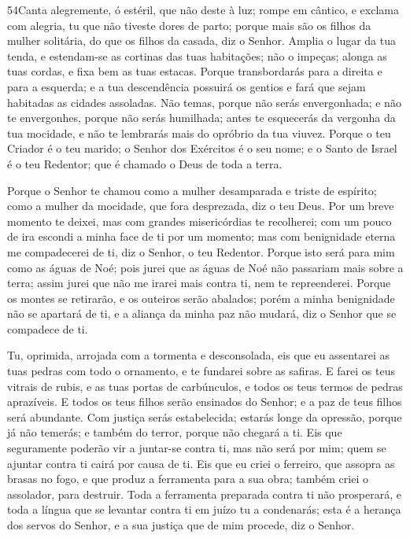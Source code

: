 \medskip

\lettrine{54}{}Canta alegremente, ó estéril, que não deste à
luz; rompe em cântico, e exclama com alegria, tu que não tiveste
dores de parto; porque mais são os filhos da mulher solitária, do
que os filhos da casada, diz o Senhor. Amplia o lugar da tua
tenda, e estendam-se as cortinas das tuas habitações; não o impeças;
alonga as tuas cordas, e fixa bem as tuas estacas. Porque
transbordarás para a direita e para a esquerda; e a tua descendência
possuirá os gentios e fará que sejam habitadas as cidades assoladas.
Não temas, porque não serás envergonhada; e não te envergonhes,
porque não serás humilhada; antes te esquecerás da vergonha da tua
mocidade, e não te lembrarás mais do opróbrio da tua viuvez.
Porque o teu Criador é o teu marido; o Senhor dos Exércitos é o
seu nome; e o Santo de Israel é o teu Redentor; que é chamado o Deus
de toda a terra.

Porque o Senhor te chamou como a mulher desamparada e triste de
espírito; como a mulher da mocidade, que fora desprezada, diz o teu
Deus. Por um breve momento te deixei, mas com grandes
misericórdias te recolherei; com um pouco de ira escondi a minha
face de ti por um momento; mas com benignidade eterna me
compadecerei de ti, diz o Senhor, o teu Redentor. Porque isto
será para mim como as águas de Noé; pois jurei que as águas de Noé
não passariam mais sobre a terra; assim jurei que não me irarei mais
contra ti, nem te repreenderei. Porque os montes se
retirarão, e os outeiros serão abalados; porém a minha benignidade
não se apartará de ti, e a aliança da minha paz não mudará, diz o
Senhor que se compadece de ti.

Tu, oprimida, arrojada com a tormenta e desconsolada, eis que eu
assentarei as tuas pedras com todo o ornamento, e te fundarei sobre
as safiras. E farei os teus vitrais de rubis, e as tuas
portas de carbúnculos, e todos os teus termos de pedras aprazíveis.
E todos os teus filhos serão ensinados do Senhor; e a paz de
teus filhos será abundante. Com justiça serás estabelecida;
estarás longe da opressão, porque já não temerás; e também do
terror, porque não chegará a ti. Eis que seguramente poderão
vir a juntar-se contra ti, mas não será por mim; quem se ajuntar
contra ti cairá por causa de ti. Eis que eu criei o ferreiro,
que assopra as brasas no fogo, e que produz a ferramenta para a sua
obra; também criei o assolador, para destruir. Toda a
ferramenta preparada contra ti não prosperará, e toda a língua que
se levantar contra ti em juízo tu a condenarás; esta é a herança dos
servos do Senhor, e a sua justiça que de mim procede, diz o Senhor.


